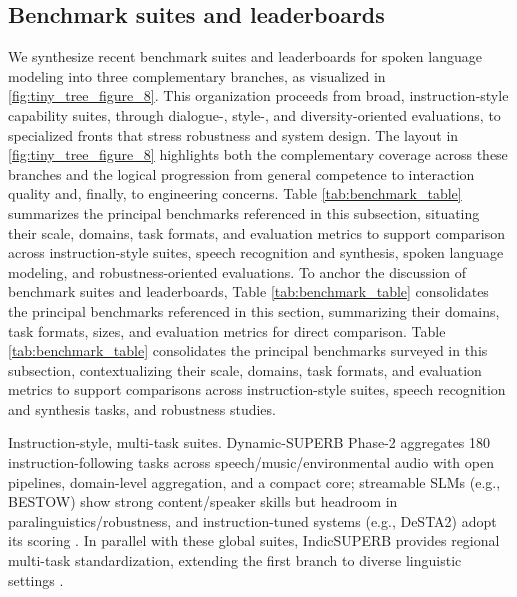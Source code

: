 \documentclass{article}
\begin{document}
\subsection{Benchmark suites and leaderboards} \label{subsec:Benchmark suites and leaderboards}



We synthesize recent benchmark suites and leaderboards for spoken language modeling into three complementary branches, as visualized in \autoref{fig:tiny_tree_figure_8}. This organization proceeds from broad, instruction-style capability suites, through dialogue-, style-, and diversity-oriented evaluations, to specialized fronts that stress robustness and system design. The layout in \autoref{fig:tiny_tree_figure_8} highlights both the complementary coverage across these branches and the logical progression from general competence to interaction quality and, finally, to engineering concerns. Table \ref{tab:benchmark_table} summarizes the principal benchmarks referenced in this subsection, situating their scale, domains, task formats, and evaluation metrics to support comparison across instruction-style suites, speech recognition and synthesis, spoken language modeling, and robustness-oriented evaluations. To anchor the discussion of benchmark suites and leaderboards, Table \ref{tab:benchmark_table} consolidates the principal benchmarks referenced in this section, summarizing their domains, task formats, sizes, and evaluation metrics for direct comparison. Table \ref{tab:benchmark_table} consolidates the principal benchmarks surveyed in this subsection, contextualizing their scale, domains, task formats, and evaluation metrics to support comparisons across instruction-style suites, speech recognition and synthesis tasks, and robustness studies.

Instruction-style, multi-task suites. Dynamic-SUPERB Phase-2 aggregates 180 instruction-following tasks across speech/music/environmental audio with open pipelines, domain-level aggregation, and a compact core; streamable SLMs (e.g., BESTOW) show strong content/speaker skills but headroom in paralinguistics/robustness, and instruction-tuned systems (e.g., DeSTA2) adopt its scoring \cite{huang2025dynamicsuperbphase2collaborativelyexpand,chen2024bestowefficientstreamablespeechlanguagem,lu2025desta2developinginstructionfollowingspee}. In parallel with these global suites, IndicSUPERB provides regional multi-task standardization, extending the first branch to diverse linguistic settings \cite{entry2025indicsuperbspeechprocessinguniversalperf}.
\end{document}
